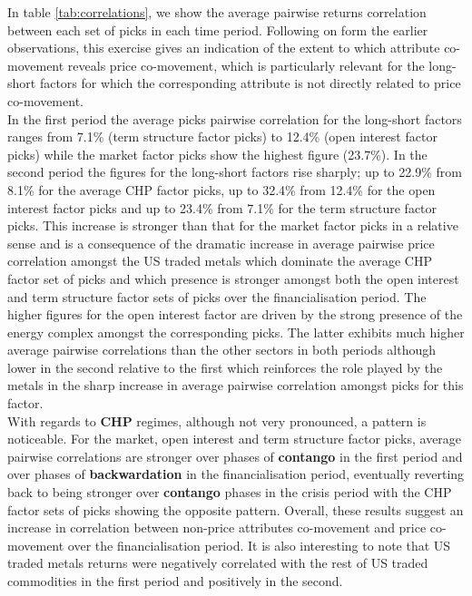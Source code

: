 \documentclass[]{elsarticle} %
\begin{document}
In table \ref{tab:correlations}, we show the average pairwise returns correlation between each set of picks in each time period. Following on form the earlier observations, this exercise gives an indication of the extent to which attribute co-movement reveals price co-movement, which is particularly relevant for the long-short factors for which the corresponding attribute is not directly related to price co-movement.\\
In the first period the average picks pairwise correlation for the long-short factors ranges from 7.1\% (term structure factor picks) to 12.4\% (open interest factor picks) while the market factor picks show the highest figure (23.7\%). In the second period the figures for the long-short factors rise sharply; up to 22.9\% from 8.1\% for the average CHP factor picks, up to 32.4\% from 12.4\% for the open interest factor picks and up to 23.4\% from 7.1\% for the term structure factor picks. This increase is stronger than that for the market factor picks in a relative sense and is a consequence of the dramatic increase in average pairwise price correlation amongst the US traded metals which dominate the average CHP factor set of picks and which presence is stronger amongst both the open interest and term structure factor sets of picks over the financialisation period. The higher figures for the open interest factor are driven by the strong presence of the energy complex amongst the corresponding picks. The latter exhibits much higher average pairwise correlations than the other sectors in both periods although lower in the second relative to the first which reinforces the role played by the metals in the sharp increase in average pairwise correlation amongst picks for this factor.\\
With regards to \textbf{CHP} regimes, although not very pronounced, a pattern is noticeable. For the market, open interest and term structure factor picks, average pairwise correlations are stronger over phases of \textbf{contango} in the first period and over phases of \textbf{backwardation} in the financialisation period, eventually reverting back to being stronger over \textbf{contango} phases in the crisis period with the CHP factor sets of picks showing the opposite pattern. Overall, these results suggest an increase in correlation between non-price attributes co-movement and price co-movement over the financialisation period. It is also interesting to note that US traded metals returns were negatively correlated with the rest of US traded commodities in the first period and positively in the second.
\end{document}
